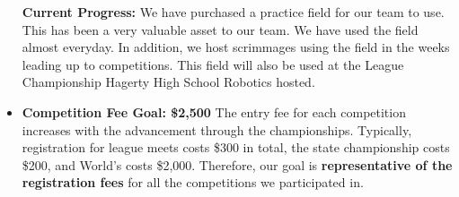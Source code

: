 \begin{itemize}
\textbf{Current Progress:} We have purchased a practice field for our team to use. This has been a very valuable asset to our team. We have used the field almost everyday. In addition, we host scrimmages using the field in the weeks leading up to competitions. This field will also be used at the League Championship Hagerty High School Robotics hosted. 
  \item \textbf{\Large Competition Fee Goal: \$2,500}
  \newline 
  The entry fee for each competition increases with the advancement through the championships. Typically, registration for league meets costs \$300 in total, the state championship costs \$200, and World's costs \$2,000. Therefore, our goal is \textbf{representative of the registration fees} for all the competitions we participated in.
  

\end{itemize}
